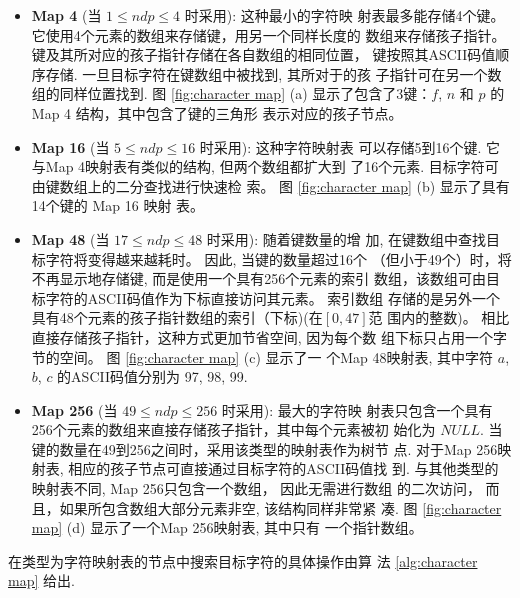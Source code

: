 \documentclass{ws-ijprai}
\begin{document}
\begin{itemize}
\item \textbf{Map 4} (当 $1 \leq ndp \leq 4$ 时采用): 这种最小的字符映
  射表最多能存储4个键。 它使用4个元素的数组来存储键，用另一个同样长度的
  数组来存储孩子指针。 键及其所对应的孩子指针存储在各自数组的相同位置，
  键按照其ASCII码值顺序存储. 一旦目标字符在键数组中被找到, 其所对于的孩
  子指针可在另一个数组的同样位置找到.  图 \ref{fig:character map} (a)
  显示了包含了3键：$f$, $n$ 和 $p$ 的 Map 4 结构，其中包含了键的三角形
  表示对应的孩子节点。

\item \textbf{Map 16} (当 $5 \leq ndp \leq 16$ 时采用): 这种字符映射表
  可以存储5到16个键. 它与Map 4映射表有类似的结构, 但两个数组都扩大到
  了16个元素. 目标字符可由键数组上的二分查找进行快速检
  索。 图 \ref{fig:character map} (b) 显示了具有14个键的 Map 16 映射
  表。


\item \textbf{Map 48} (当 $17 \leq ndp \leq 48$ 时采用): 随着键数量的增
  加, 在键数组中查找目标字符将变得越来越耗时。 因此, 当键的数量超过16个
  （但小于49个）时，将不再显示地存储键, 而是使用一个具有256个元素的索引
  数组，该数组可由目标字符的ASCII码值作为下标直接访问其元素。 索引数组
  存储的是另外一个具有48个元素的孩子指针数组的索引（下标)(在$[0,47]$范
  围内的整数)。 相比直接存储孩子指针，这种方式更加节省空间, 因为每个数
  组下标只占用一个字节的空间。 图 \ref{fig:character map} (c) 显示了一
  个Map 48映射表, 其中字符 $a$, $b$, $c$ 的ASCII码值分别为 97, 98, 99.

\item \textbf{Map 256} (当 $49 \leq ndp \leq 256$ 时采用): 最大的字符映
  射表只包含一个具有256个元素的数组来直接存储孩子指针，其中每个元素被初
  始化为 $NULL$. 当键的数量在49到256之间时，采用该类型的映射表作为树节
  点. 对于Map 256映射表, 相应的孩子节点可直接通过目标字符的ASCII码值找
  到. 与其他类型的映射表不同, Map 256只包含一个数组， 因此无需进行数组
  的二次访问， 而且，如果所包含数组大部分元素非空, 该结构同样非常紧
  凑. 图 \ref{fig:character map} (d) 显示了一个Map 256映射表, 其中只有
  一个指针数组。
\end{itemize}

在类型为字符映射表的节点中搜索目标字符的具体操作由算
法 \ref{alg:character map} 给出.
\end{document}
